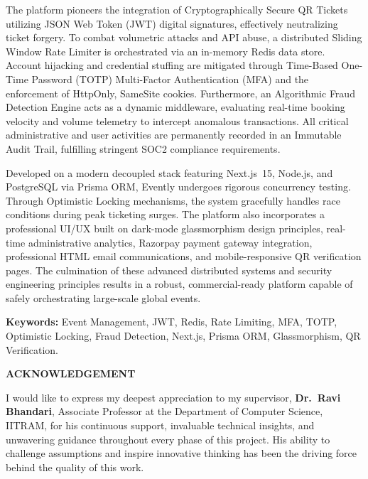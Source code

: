 \documentclass[12pt,a4paper]{report}
\begin{document}
The platform pioneers the integration of Cryptographically Secure QR Tickets utilizing JSON Web Token (JWT) digital signatures, effectively neutralizing ticket forgery. To combat volumetric attacks and API abuse, a distributed Sliding Window Rate Limiter is orchestrated via an in-memory Redis data store. Account hijacking and credential stuffing are mitigated through Time-Based One-Time Password (TOTP) Multi-Factor Authentication (MFA) and the enforcement of HttpOnly, SameSite cookies. Furthermore, an Algorithmic Fraud Detection Engine acts as a dynamic middleware, evaluating real-time booking velocity and volume telemetry to intercept anomalous transactions. All critical administrative and user activities are permanently recorded in an Immutable Audit Trail, fulfilling stringent SOC2 compliance requirements.

Developed on a modern decoupled stack featuring Next.js~15, Node.js, and PostgreSQL via Prisma ORM, Evently undergoes rigorous concurrency testing. Through Optimistic Locking mechanisms, the system gracefully handles race conditions during peak ticketing surges. The platform also incorporates a professional UI/UX built on dark-mode glassmorphism design principles, real-time administrative analytics, Razorpay payment gateway integration, professional HTML email communications, and mobile-responsive QR verification pages. The culmination of these advanced distributed systems and security engineering principles results in a robust, commercial-ready platform capable of safely orchestrating large-scale global events.

\textbf{Keywords:} Event Management, JWT, Redis, Rate Limiting, MFA, TOTP, Optimistic Locking, Fraud Detection, Next.js, Prisma ORM, Glassmorphism, QR Verification.

\clearpage
{}
{}
\begin{center}{\Large \textbf{ACKNOWLEDGEMENT}}\end{center}
\vspace{0.5cm}

I would like to express my deepest appreciation to my supervisor, \textbf{Dr.\ Ravi Bhandari}, Associate Professor at the Department of Computer Science, IITRAM, for his continuous support, invaluable technical insights, and unwavering guidance throughout every phase of this project. His ability to challenge assumptions and inspire innovative thinking has been the driving force behind the quality of this work.
\end{document}
